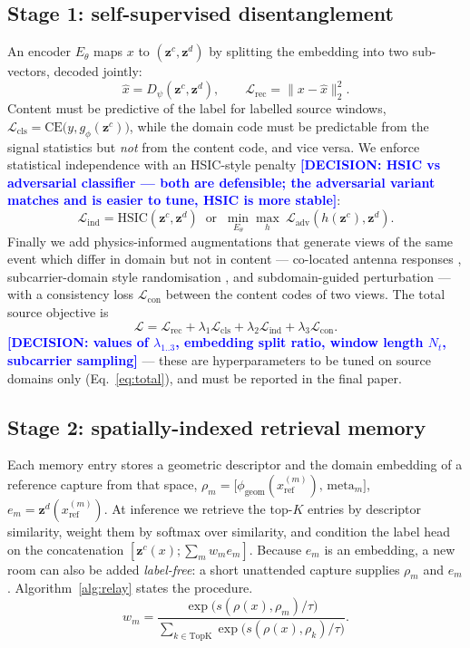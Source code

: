 \documentclass[conference]{IEEEtran}
\newcommand{\DECISION}[1]{\textcolor{blue}{\textbf{[DECISION: #1]}}}
\newcommand{\zc}{\mathbf{z}^{c}}      %
\newcommand{\zd}{\mathbf{z}^{d}}      %
\begin{document}
\subsection{Stage 1: self-supervised disentanglement}
An encoder $E_\theta$ maps $x$ to $(\zc,\zd)$ by splitting the embedding into two
sub-vectors, decoded jointly:
\begin{equation}
\hat{x} = D_\psi(\zc, \zd), \qquad
\mathcal{L}_{\mathrm{rec}} = \|x-\hat{x}\|_2^2 .
\end{equation}
Content must be predictive of the label for labelled source windows,
$\mathcal{L}_{\mathrm{cls}} = \mathrm{CE}\big(y, g_\phi(\zc)\big)$, while the domain code
must be predictable from the signal statistics but \emph{not} from the content code, and
vice versa. We enforce statistical independence with an HSIC-style penalty
\DECISION{HSIC vs adversarial classifier --- both are defensible; the adversarial variant
matches \cite{Kang2021ContextAware} and is easier to tune, HSIC is more stable}:
\begin{equation}
\mathcal{L}_{\mathrm{ind}} = \mathrm{HSIC}(\zc, \zd) \;\; \text{or} \;\;
\min_{E_\theta}\max_{h}\ \mathcal{L}_{\mathrm{adv}}(h(\zc),\zd).
\end{equation}
Finally we add physics-informed augmentations that generate views of the same event which
differ in domain but not in content --- co-located antenna responses
\cite{Xu2023ARCFi}, subcarrier-domain style randomisation \cite{Liu2024WiSR}, and
subdomain-guided perturbation \cite{Liu2024WiSGP} --- with a consistency loss
$\mathcal{L}_{\mathrm{con}}$ between the content codes of two views. The total source
objective is
\begin{equation}
\mathcal{L} = \mathcal{L}_{\mathrm{rec}} + \lambda_1 \mathcal{L}_{\mathrm{cls}}
+ \lambda_2 \mathcal{L}_{\mathrm{ind}} + \lambda_3 \mathcal{L}_{\mathrm{con}} .
\label{eq:total}
\end{equation}
\DECISION{values of $\lambda_{1..3}$, embedding split ratio, window length $N_t$,
subcarrier sampling} --- these are hyperparameters to be tuned on source domains only
(Eq.~\eqref{eq:total}), and must be reported in the final paper.

\subsection{Stage 2: spatially-indexed retrieval memory}
Each memory entry stores a geometric descriptor and the domain embedding of a reference
capture from that space,
$\rho_m = \big[\phi_{\mathrm{geom}}(x^{(m)}_{\mathrm{ref}}),\, \text{meta}_m\big]$,
$e_m = \zd(x^{(m)}_{\mathrm{ref}})$. At inference we retrieve the top-$K$ entries by
descriptor similarity, weight them by softmax over similarity, and condition the label
head on the concatenation $[\zc(x); \sum_m w_m e_m]$. Because $e_m$ is an embedding, a new
room can also be added \emph{label-free}: a short unattended capture supplies $\rho_m$ and
$e_m$. Algorithm~\ref{alg:relay} states the procedure.
\begin{equation}
w_m = \frac{\exp\!\big(s(\rho(x),\rho_m)/\tau\big)}{\sum_{k\in\mathrm{TopK}}\exp\!\big(s(\rho(x),\rho_k)/\tau\big)} .
\end{equation}
\end{document}
